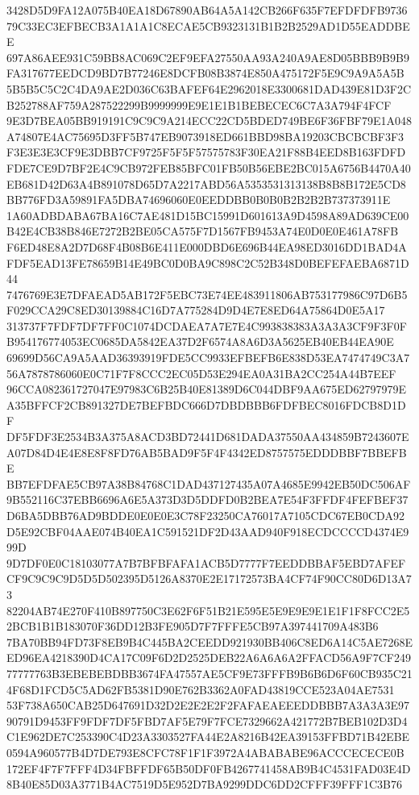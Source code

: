 \documentclass[UTF8,fontset=fandol,zihao=-4,a4paper]{ctexart}
\begin{document}
{{3428D5D9FA12A075B40EA18D67890AB64A5A142CB266F635F7EFDFDFB973679C33EC3EFBECB3A1A1A1C8ECAE5CB9323131B1B2B2529AD1D55EADDBEE
697A86AEE931C59BB8AC069C2EF9EFA27550AA93A240A9AE8D05BBB9B9B9FA317677EEDCD9BD7B77246E8DCFB08B3874E850A475172F5E9C9A9A5A5B
5B5B5C5C2C4DA9AE2D036C63BAFEF64E2962018E3300681DAD439E81D3F2CB252788AF759A287522299B9999999E9E1E1B1BEBECEC6C7A3A794F4FCF
9E3D7BEA05BB919191C9C9C9A214ECC22CD5BDED749BE6F36FBF79E1A048A74807E4AC75695D3FF5B747EB9073918ED661BBD98BA19203CBCBCBF3F3
F3E3E3E3CF9E3DBB7CF9725F5F5F57575783F30EA21F88B4EED8B163FDFDFDE7CE9D7BF2E4C9CB972FEB85BFC01FB50B56EBE2BC015A6756B4470A40
EB681D42D63A4B891078D65D7A2217ABD56A5353531313138B8B8B172E5CD8BB776FD3A59891FA5DBA74696060E0EEDDBB0B0B0B2B2B2B737373911E
1A60ADBDABA67BA16C7AE481D15BC15991D601613A9D4598A89AD639CE00B42E4CB38B846E7272B2BE05CA575F7D1567FB9453A74E0D0E0E461A78FB
F6ED48E8A2D7D68F4B08B6E411E000DBD6E696B44EA98ED3016DD1BAD4AFDF5EAD13FE78659B14E49BC0D0BA9C898C2C52B348D0BEFEFAEBA6871D44
7476769E3E7DFAEAD5AB172F5EBC73E74EE483911806AB753177986C97D6B5F029CCA29C8ED30139884C16D7A775284D9D4E7E8ED64A75864D0E5A17
313737F7FDF7DF7FF0C1074DCDAEA7A7E7E4C993838383A3A3A3CF9F3F0FB954176774053EC0685DA5842EA37D2F6574A8A6D3A5625EB40EB44EA90E
69699D56CA9A5AAD36393919FDE5CC9933EFBEFB6E838D53EA7474749C3A756A7878786060E0C71F7F8CCC2EC05D53E294EA0A31BA2CC254A44B7EEF
96CCA082361727047E97983C6B25B40E81389D6C044DBF9AA675ED62797979EA35BFFCF2CB891327DE7BEFBDC666D7DBDBBB6FDFBEC8016FDCB8D1DF
DF5FDF3E2534B3A375A8ACD3BD72441D681DADA37550AA434859B7243607EA07D84D4E4E8E8F8FD76AB5BAD9F5F4F4342ED8757575EDDDBBF7BBEFBE
BB7EFDFAE5CB97A38B84768C1DAD437127435A07A4685E9942EB50DC506AF9B552116C37EBB6696A6E5A373D3D5DDFD0B2BEA7E54F3FFDF4FEFBEF37
D6BA5DBB76AD9BDDE0E0E0E3C78F23250CA76017A7105CDC67EB0CDA92D5E92CBF04AAE074B40EA1C591521DF2D43AAD940F918ECDCCCCD4374E999D
9D7DF0E0C18103077A7B7BFBFAFA1ACB5D7777F7EEDDBBAF5EBD7AFEFCF9C9C9C9D5D5D502395D5126A8370E2E17172573BA4CF74F90CC80D6D13A73
82204AB74E270F410B897750C3E62F6F51B21E595E5E9E9E9E1E1F1F8FCC2E52BCB1B1B183070F36DD12B3FE905D7F7FFFE5CB97A397441709A483B6
7BA70BB94FD73F8EB9B4C445BA2CEEDD921930BB406C8ED6A14C5AE7268EED96EA4218390D4CA17C09F6D2D2525DEB22A6A6A6A2FFACD56A9F7CF249
77777763B3EBEBEBDBB3674FA47557AE5CF9E73FFFB9B6B6D6F60CB935C214F68D1FCD5C5AD62FB5381D90E762B3362A0FAD43819CCE523A04AE7531
53F738A650CAB25D647691D32D2E2E2E2F2FAFAEAEEEDDBBB7A3A3A3E9790791D9453FF9FDF7DF5FBD7AF5E79F7FCE7329662A421772B7BEB102D3D4
C1E962DE7C253390C4D23A3303527FA44E2A8216B42EA39153FFBD71B42EBE0594A960577B4D7DE793E8CFC78F1F1F3972A4ABABABE96ACCCECECE0B
172EF4F7F7FFF4D34FBFFDF65B50DF0FB4267741458AB9B4C4531FAD03E4D8B40E85D03A3771B4AC7519D5E952D7BA9299DDC6DD2CFFF39FFF1C3B76
}}
\end{document}
